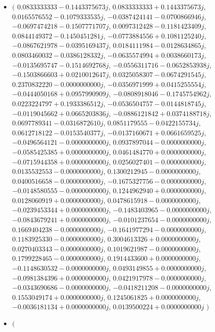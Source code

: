 \documentclass[14pt,a4paper]{article}
\begin{document}
\begin{itemize}
\item
$\big($
$0.0833333333-0.1443375673j$, $0.0833333333+0.1443375673j$, $0.0165576552-0.1079333535j$, $-0.0387424141-0.0700866946j$, $-0.0697474218-0.1507771707j$, $0.0097312428-0.1181423409j$, $0.0844149372-0.1450451281j$, $-0.0773884556+0.1081125240j$, $-0.0867621978-0.0395169437j$, $0.0184111984-0.0128634865j$, $0.0803460032-0.0386128332j$, $-0.0635574994+0.0038660173j$, $-0.0135695747-0.1514692768j$, $-0.0556311716-0.0652853938j$, $-0.1503866603+0.0210012647j$, $0.0325058307-0.0674291545j$, $0.2370832220-0.0000000000j$, $-0.0356971999+0.0415255554j$, $-0.0444050168+0.0957990909j$, $-0.0808918046-0.1745754962j$, $0.0223224797+0.1933386512j$, $-0.0536504757-0.0144818745j$, $-0.0119045662+0.0665203836j$, $-0.0886121842+0.0374188718j$, $0.0697789341-0.0316872610j$, $0.0851179555-0.0422155734j$, $0.0612718122-0.0153540377j$, $-0.0137160671+0.0661659525j$, $-0.0496564121-0.0000000000j$, $0.0937897044-0.0000000000j$, $-0.0585425385+0.0000000000j$, $0.0461484770+0.0000000000j$, $-0.0715944358+0.0000000000j$, $0.0256027401-0.0000000000j$, $0.0135532553-0.0000000000j$, $0.1300212945-0.0000000000j$, $0.0400516658-0.0000000000j$, $-0.1675327756-0.0000000000j$, $-0.0148580555-0.0000000000j$, $0.1244962940+0.0000000000j$, $0.0128060919+0.0000000000j$, $0.0478615918-0.0000000000j$, $-0.0239453344+0.0000000000j$, $-0.1483403965-0.0000000000j$, $-0.0843679241+0.0000000000j$, $-0.0101237654-0.0000000000j$, $0.1669404238-0.0000000000j$, $-0.1641977294-0.0000000000j$, $0.1183925330-0.0000000000j$, $0.3004613326+0.0000000000j$, $0.0270403343-0.0000000000j$, $0.1019621987-0.0000000000j$, $0.1799228465-0.0000000000j$, $0.1914433600+0.0000000000j$, $-0.1148630532-0.0000000000j$, $0.0493149855+0.0000000000j$, $-0.0981384396+0.0000000000j$, $0.0421917978-0.0000000000j$, $-0.0343690686-0.0000000000j$, $-0.0418211208-0.0000000000j$, $0.1553049174+0.0000000000j$, $0.1245061825+0.0000000000j$, $-0.0036181134+0.0000000000j$, $0.0139500224+0.0000000000j$
$\big)$
\item
$\big($

\end{itemize}
\end{document}

